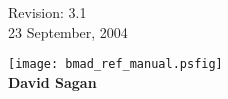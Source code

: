\thispagestyle{empty}

\begin{flushright}
\large
  Revision: 3.1 \\
  23 September, 2004 \\
\end{flushright}

\vfill

{
\begin{center}
\texttt{[image: bmad\_ref\_manual.psfig]} \\
\vskip 0.3in
\huge\bf David Sagan
\end{center}
}


\vfill
\break